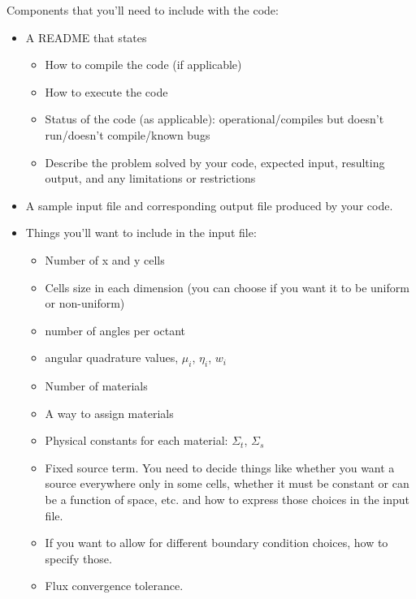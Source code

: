 \documentclass[12pt]{article}
\begin{document}
Components that you'll need to include with the code:
\begin{itemize}
\item A README that states
  \begin{itemize}
  \item How to compile the code (if applicable)
  \item How to execute the code
  \item Status of the code (as applicable): operational/compiles but doesn't run/doesn't compile/known bugs
  \item Describe the problem solved by your code, expected input, resulting output, and any limitations or restrictions
  \end{itemize}
  
\item A sample input file and corresponding output file produced by your code.

\item Things you'll want to include in the input file:
  \begin{itemize}
  \item Number of x and y cells
  \item Cells size in each dimension (you can choose if you want it to be uniform or non-uniform)
  \item number of angles per octant
  \item angular quadrature values, $\mu_i$, $\eta_i$, $w_i$
  \item Number of materials
  \item A way to assign materials
  \item Physical constants for each material: $\Sigma_t$, $\Sigma_s$
  \item Fixed source term. You need to decide things like whether you want a source everywhere only in some cells, whether it must be constant or can be a function of space, etc. and how to express those choices in the input file.
  \item If you want to allow for different boundary condition choices, how to specify those.
  \item Flux convergence tolerance.
  \end{itemize}
  
\end{itemize}
\end{document}
